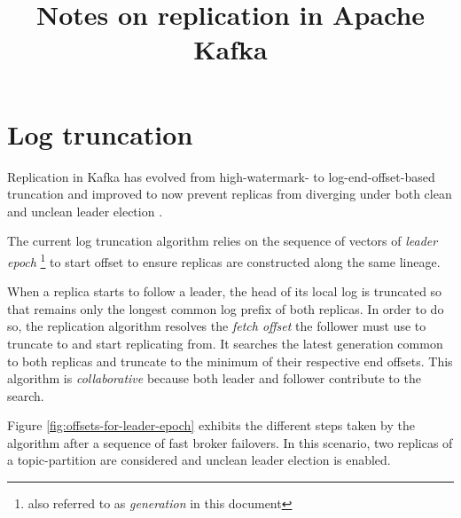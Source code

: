 \documentclass{article}
\title{Notes on replication in Apache Kafka}
\begin{document}
\section{Log truncation}

Replication in Kafka has evolved from high-watermark- to log-end-offset-based truncation \cite{KIP101} and improved to now prevent replicas from diverging under both clean and unclean leader election \cite{KIP279}.

The current log truncation algorithm relies on the sequence of vectors of \textit{leader epoch} \footnote{also referred to as \textit{generation} in this document} to start offset to ensure replicas are constructed along the same lineage.

When a replica starts to follow a leader, the head of its local log is truncated so that remains only the longest common log prefix of both replicas. In order to do so, the replication algorithm resolves the \textit{fetch offset} the follower must use to truncate to and start replicating from. It searches the latest generation common to both replicas and truncate to the minimum of their respective end offsets. This algorithm is \textit{collaborative} because both leader and follower contribute to the search.

Figure \ref{fig:offsets-for-leader-epoch} exhibits the different steps taken by the algorithm after a sequence of fast broker failovers. In this scenario, two replicas of a topic-partition are considered and unclean leader election is enabled.
\end{document}
